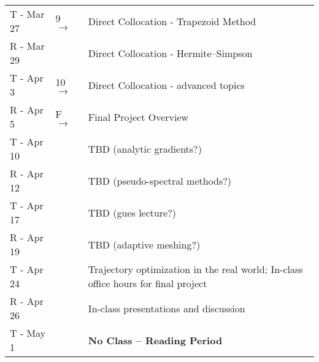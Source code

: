 \documentclass[onecolumn]{article}
\newcommand{\ra}{$\rightarrow$}
\begin{document}
\begin{table}
\begin{tabular}{l|l|l}
    \hline
    T - Mar 27 &  9 \ra & Direct Collocation - Trapezoid Method \\
    R - Mar 29 &        & Direct Collocation - Hermite--Simpson \\
    \hline
    T - Apr 3  & 10 \ra & Direct Collocation - advanced topics \\
    R - Apr 5  & F  \ra & Final Project Overview \\
    T - Apr 10 &        & TBD (analytic gradients?) \\
    \hline
    R - Apr 12 &        & TBD (pseudo-spectral methods?) \\
    T - Apr 17 &        & TBD (gues lecture?) \\
    \hline
    R - Apr 19 &        & TBD (adaptive meshing?) \\
    T - Apr 24 &        & Trajectory optimization in the real world; In-class office hours for final project \\
    R - Apr 26 &        & In-class presentations and discussion \\
    T - May 1  &        & \textbf{No Class -- Reading Period} \\
    \hline
    \end{tabular}
\end{table}



\end{document}
